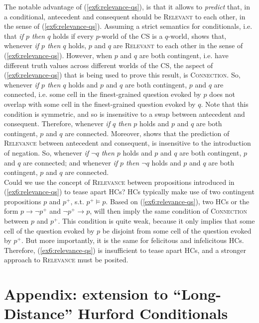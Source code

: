 The notable advantage of (\ref{ex6:relevance-qs}), is that it allows to \textit{predict} that, in a conditional, antecedent and consequent should be \textsc{Relevant} to each other, in the sense of (\ref{ex6:relevance-qs}). Assuming a strict semantics for conditionals, i.e. that \textit{if $p$ then $q$} holds if every $p$-world of the CS is a $q$-world, \citeauthor{Lewis1988} shows that, whenever \textit{if $p$ then $q$} holds, $p$ and $q$ are \textsc{Relevant} to each other in the sense of (\ref{ex6:relevance-qs}). However, when $p$ and $q$ are both contingent, i.e. have different truth values across different worlds of the CS, the aspect of (\ref{ex6:relevance-qs}) that is being used to prove this result, is \textsc{Connection}. So, whenever \textit{if $p$ then $q$} holds and $p$ and $q$ are both contingent, $p$ and $q$ are connected, i.e. some cell in the finest-grained question evoked by $p$ does not overlap with some cell in the finest-grained question evoked by $q$. Note that this condition is symmetric, and so is insensitive to a swap between antecedent and consequent. Therefore, whenever \textit{if $q$ then $p$} holds and $p$ and $q$ are both contingent, $p$ and $q$ are connected. Moreover, \citeauthor{Lewis1988} shows that the prediction of \textsc{Relevance} between antecedent and consequent, is insensitive to the introduction of negation. So, whenever \textit{if $\neg q$ then $p$} holds and $p$ and $q$ are both contingent, $p$ and $q$ are connected; and whenever \textit{if $p$ then $\neg q$} holds and $p$ and $q$ are both contingent, $p$ and $q$ are connected.\\

Could we use the concept of \textsc{Relevance} between propositions introduced in (\ref{ex6:relevance-qs}) to tease apart HCs? HCs typically make use of two contingent propositions $p$ and $p^+$, s.t. $p^+ \vDash p$. Based on (\ref{ex6:relevance-qs}), two HCs or the form $p \rightarrow \neg p^+$ and $\neg p^+ \rightarrow p$, will then imply the same condition of \textsc{Connection} between $p$ and $p^+$. This condition is quite weak, because it only implies that some cell of the question evoked by $p$ be disjoint from some cell of the question evoked by $p^+$. But more importantly, it is the same for felicitous and infelicitous HCs. Therefore,  (\ref{ex6:relevance-qs}) is insufficient to tease apart HCs, and a stronger approach to \textsc{Relevance} must be posited. 

\section{Appendix: extension to ``Long-Distance'' Hurford Conditionals}\label{sec6:ldhc}

